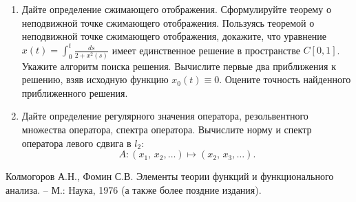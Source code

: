 %
%

\begin{enumerate}
\item Дайте определение сжимающего отображения. Сформулируйте теорему о неподвижной точке сжимающего отображения. 
Пользуясь теоремой о неподвижной точке сжимающего отображения, докажите, что уравнение $x(t) =\displaystyle{\int_0^t \frac{ds}{2+x^2(s)}}$ имеет единственное решение в пространстве $C[0,1]$. Укажите алгоритм поиска решения. Вычислите первые два приближения к решению, взяв исходную функцию $x_0(t) \equiv 0$. Оцените точность найденного приближенного решения. 

\item Дайте определение регулярного значения оператора, резольвентного множества оператора, спектра оператора. 
Вычислите норму и спектр оператора левого сдвига в $l_2$:  $$A: (x_1,\,x_2,\ldots)\mapsto(x_2,\,x_3,\ldots).$$
\end{enumerate}

\bigskip
[1]  Колмогоров А.Н., Фомин С.В. Элементы теории функций и функционального анализа. – М.: Наука, 1976 (а также более поздние издания).




